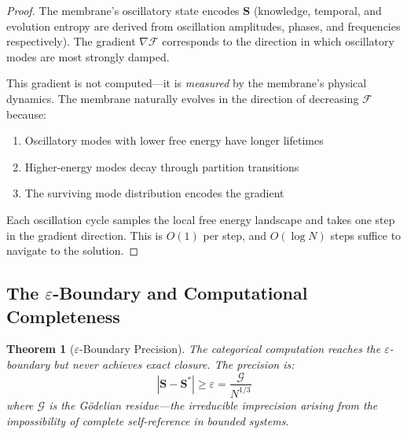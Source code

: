 \documentclass[twocolumn,10pt]{article}
\newtheorem{theorem}{Theorem}[section]
\theoremstyle{remark}
\newcommand{\eps}{\varepsilon}
\newcommand{\Gres}{\mathcal{G}}
\newcommand{\Scoord}{\mathbf{S}}
\begin{document}
\begin{proof}
The membrane's oscillatory state encodes $\Scoord$ (knowledge, temporal, and evolution entropy are derived from oscillation amplitudes, phases, and frequencies respectively). The gradient $\nabla\mathcal{F}$ corresponds to the direction in which oscillatory modes are most strongly damped.

This gradient is not computed---it is \emph{measured} by the membrane's physical dynamics. The membrane naturally evolves in the direction of decreasing $\mathcal{F}$ because:
\begin{enumerate}
    \item Oscillatory modes with lower free energy have longer lifetimes
    \item Higher-energy modes decay through partition transitions
    \item The surviving mode distribution encodes the gradient
\end{enumerate}

Each oscillation cycle samples the local free energy landscape and takes one step in the gradient direction. This is $O(1)$ per step, and $O(\log N)$ steps suffice to navigate to the solution.
\end{proof}

\subsection{The $\eps$-Boundary and Computational Completeness}

\begin{theorem}[$\eps$-Boundary Precision]
\label{thm:eps_boundary}
The categorical computation reaches the $\eps$-boundary but never achieves exact closure. The precision is:
\begin{equation}
    |\Scoord - \Scoord^*| \geq \eps = \frac{\Gres}{N^{1/3}}
\end{equation}
where $\Gres$ is the G\"odelian residue---the irreducible imprecision arising from the impossibility of complete self-reference in bounded systems.
\end{theorem}
\end{document}
